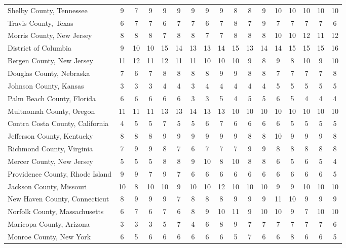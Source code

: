 \begin{landscape}
\begin{longtable}{lcccccccccccccccc}
	Shelby County, Tennessee & 9 & 7 & 9 & 9 & 9 & 9 & 9 & 9 & 8 & 8 & 9 & 10 & 10 & 10 & 10 & 10 \\
	Travis County, Texas & 6 & 7 & 7 & 6 & 7 & 7 & 6 & 7 & 8 & 7 & 9 & 7 & 7 & 7 & 7 & 6 \\
	Morris County, New Jersey & 8 & 8 & 8 & 7 & 8 & 8 & 7 & 7 & 8 & 8 & 8 & 10 & 10 & 12 & 11 & 12 \\
	District of Columbia & 9 & 10 & 10 & 15 & 14 & 13 & 13 & 14 & 15 & 13 & 14 & 14 & 15 & 15 & 15 & 16 \\
	Bergen County, New Jersey & 11 & 12 & 11 & 12 & 11 & 11 & 10 & 10 & 10 & 9 & 8 & 9 & 8 & 10 & 9 & 10 \\
	Douglas County, Nebraska & 7 & 6 & 7 & 8 & 8 & 8 & 8 & 9 & 9 & 8 & 8 & 7 & 7 & 7 & 7 & 8 \\
	Johnson County, Kansas & 3 & 3 & 3 & 4 & 4 & 3 & 4 & 4 & 4 & 4 & 4 & 5 & 5 & 5 & 5 & 5 \\
	Palm Beach County, Florida & 6 & 6 & 6 & 6 & 6 & 3 & 3 & 5 & 4 & 5 & 5 & 6 & 5 & 4 & 4 & 4 \\
	Multnomah County, Oregon & 11 & 11 & 11 & 13 & 13 & 14 & 13 & 13 & 10 & 10 & 10 & 10 & 10 & 10 & 10 & 10 \\
	Contra Costa County, California & 4 & 5 & 5 & 7 & 5 & 5 & 6 & 7 & 6 & 6 & 6 & 6 & 5 & 5 & 5 & 5 \\
	Jefferson County, Kentucky & 8 & 8 & 8 & 9 & 9 & 9 & 9 & 9 & 9 & 8 & 8 & 10 & 9 & 9 & 9 & 8 \\
	Richmond County, Virginia & 7 & 9 & 9 & 8 & 7 & 6 & 7 & 7 & 7 & 9 & 9 & 8 & 8 & 8 & 8 & 8 \\
	Mercer County, New Jersey & 5 & 5 & 5 & 8 & 8 & 9 & 10 & 8 & 10 & 8 & 8 & 6 & 5 & 6 & 5 & 4 \\
	Providence County, Rhode Island & 9 & 9 & 7 & 9 & 7 & 6 & 6 & 6 & 6 & 6 & 6 & 6 & 6 & 6 & 6 & 5 \\
	Jackson County, Missouri & 10 & 8 & 10 & 10 & 9 & 10 & 10 & 12 & 10 & 10 & 10 & 9 & 9 & 10 & 10 & 10 \\
	New Haven County, Connecticut & 8 & 9 & 9 & 9 & 7 & 8 & 8 & 8 & 9 & 9 & 9 & 11 & 10 & 9 & 9 & 9 \\
	Norfolk County, Massachusetts & 6 & 7 & 6 & 7 & 6 & 8 & 9 & 10 & 11 & 9 & 10 & 10 & 9 & 7 & 10 & 10 \\
	Maricopa County, Arizona & 3 & 3 & 3 & 5 & 7 & 4 & 6 & 8 & 9 & 7 & 7 & 7 & 7 & 7 & 7 & 6 \\
	Monroe County, New York & 6 & 5 & 6 & 6 & 6 & 6 & 6 & 6 & 5 & 7 & 6 & 6 & 8 & 6 & 6 & 5 \\

\end{longtable}
\end{landscape}
